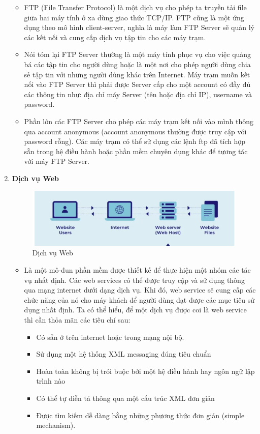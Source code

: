 \documentclass[13pt]{article}
\begin{document}
\begin{enumerate}
    \begin{itemize}
        \item FTP (File Transfer Protocol) là một dịch vụ cho phép ta truyền tải file giữa hai máy tính ở xa dùng giao thức TCP/IP. FTP cũng là một ứng dụng theo mô hình client-server, nghĩa là máy làm FTP Server sẽ quản lý các kết nối và cung cấp dịch vụ tập tin cho các máy trạm.
        \item Nói tóm lại FTP Server thường là một máy tính phục vụ cho việc quảng bá các tập tin cho người dùng hoặc là một nơi cho phép người dùng chia sẻ tập tin với những người dùng khác trên Internet. Máy trạm muốn kết nối vào FTP Server thì phải được Server cấp cho một account có đầy đủ các thông tin như: địa chỉ máy Server (tên hoặc địa chỉ IP), username và password. 
        \item Phần lớn các FTP Server cho phép các máy trạm kết nối vào mình thông qua account anonymous (account anonymous thường được truy cập với password rỗng). Các máy trạm có thể sử dụng các lệnh ftp đã tích hợp sẵn trong hệ điều hành hoặc phần mềm chuyên dụng khác để tương tác với máy FTP Server.
    \end{itemize}
    
    \item \textbf{Dịch vụ Web}
    \begin{figure}[h!]
        \centering
        \includegraphics[width=0.7\linewidth]{image/4.png}
            \caption{Dịch vụ Web}
            \label{fig:label1}
    \end{figure}
    
    \begin{itemize}
        \item Là một mô-đun phần mềm được thiết kế để thực hiện một nhóm các tác vụ nhất định. Các web services có thể được truy cập và sử dụng thông qua mạng internet dưới dạng dịch vụ. Khi đó, web service sẽ cung cấp các chức năng của nó cho máy khách để người dùng đạt được các mục tiêu sử dụng nhất định. Ta có thể hiểu, để một dịch vụ được coi là web service thì cần thỏa mãn các tiêu chí sau:
        \begin{itemize}
            \item Có sẵn ở trên internet hoặc trong mạng nội bộ.
            \item Sử dụng một hệ thống XML messaging đúng tiêu chuẩn
            \item Hoàn toàn không bị trói buộc bởi một hệ điều hành hay ngôn ngữ lập trình nào
            \item Có thể tự diễn tả thông qua một cấu trúc XML đơn giản
            \item Được tìm kiếm dễ dàng bằng những phương thức đơn giản (simple mechanism).
        \end{itemize}	
    \end{itemize}


\end{enumerate}
\end{document}
